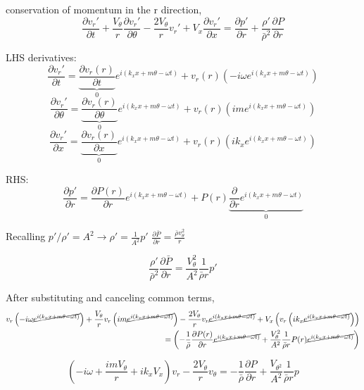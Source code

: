 \documentclass[12pt]{article}
\begin{document}
\newpage
conservation of momentum in the r direction,
\[
\frac{\partial v_r'}{\partial t} +
\frac{V_{\theta}}{r} \frac{\partial v_r'}{\partial \theta} - \frac{2V_{\theta}}{r}v_r' + V_x\frac{\partial v_r'}{\partial x} = \frac{\partial p'}{\partial r} + \frac{\rho'}{\bar{\rho}^2}\frac{\partial P}{\partial r}
\]

LHS derivatives:
\[\frac{\partial v_r'}{\partial t} =
 \underbrace{\frac{\partial v_r(r)}{\partial t}}_{0} e^{i\left(k_x x + m \theta - \omega t \right)} +
  v_r(r) \left(-i\omega e^{i\left(k_x x + m \theta - \omega t \right)}\right) \]
\[\frac{\partial v_r'}{\partial \theta} = 
\underbrace{\frac{\partial v_r(r)}{\partial \theta}}_{0} e^{i\left(k_x x + m \theta - \omega t \right)} + v_r(r) \left(im e^{i\left(k_x x + m \theta - \omega t \right)}\right) \]
\[\frac{\partial v_r'}{\partial x} = \underbrace{\frac{\partial v_r(r)}{\partial x}}_{0} e^{i\left(k_x x + m \theta - \omega t \right)} + v_r(r) \left(ik_x e^{i\left(k_x x + m \theta - \omega t \right)}\right) \]

RHS:
\[\frac{\partial p'}{\partial r} = \frac{\partial P(r)}{\partial r} e^{i\left(k_x x + m \theta - \omega t \right)} + P(r)\underbrace{\frac{\partial}{\partial  r} e^{i\left(k_x x + m \theta - \omega t \right)}}_0 \]

Recalling $ p'/\rho' = A^2 \rightarrow \rho' = \frac{1}{A^2}p' $ $ \frac{\partial \bar{P}}{\partial r} = \frac{\bar{\rho} v_{\theta}^2}{r} $

\[\frac{\rho ' }{\bar{\rho}^2} \frac{ \partial \bar{P}}{\partial r} = \frac{V_{\theta}^2}{A^2}\frac{1}{\bar{\rho} r}p'\]


After substituting and canceling common terms,
\begin{align*}
 v_r \left(-i\omega \cancel{e^{i\left(k_x x + m \theta - \omega t \right)}}\right)+
\frac{V_{\theta}}{r} v_r \left(im \cancel{e^{i\left(k_x x + m \theta - \omega t \right)}}\right) -
\frac{2V_{\theta}}{r}v_r  \cancel{e^{i\left(k_x x + m \theta - \omega t \right)}} + V_x \left(v_r \left(ik_x \cancel{e^{i\left(k_x x + m \theta - \omega t \right)}}\right)\right) \\
=   \left(-\frac{1}{\bar{\rho}} \frac{\partial P(r)}{\partial r}\cancel{e^{i\left(k_x x + m \theta - \omega t \right)} } +  \frac{V_{\theta}^2}{A^2}\frac{1}{\bar{\rho} r} P(r)\cancel{e^{i\left(k_x x + m \theta - \omega t \right)} }\right) 
\end{align*}

\[\left(-i\omega + \frac{i m V_{\theta}}{r} + i k_x V_x \right) v_r - \frac{2 V_{\theta}}{r}v_{\theta}  = -\frac{1}{\bar{\rho}} \frac{\partial P}{\partial r}+ \frac{V_{\theta^2}}{A^2}\frac{1}{\bar{\rho} r}p\]
\end{document}
